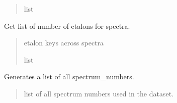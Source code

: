 \documentclass[letterpaper,10pt,english]{sphinxmanual}
\begin{document}
\begin{fulllineitems}
\begin{fulllineitems}
\begin{quote}
\begin{description}
\sphinxAtStartPar
list

\end{description}\end{quote}

\end{fulllineitems}


\begin{fulllineitems}
\label{\detokenize{MATS:MATS.dataset.Dataset.get_dataset_name}}
\pysigstartsignatures
{}
\pysigstopsignatures
\end{fulllineitems}


\begin{fulllineitems}
\label{\detokenize{MATS:MATS.dataset.Dataset.get_etalons}}
\pysigstartsignatures
{}
\pysigstopsignatures
\sphinxAtStartPar
Get list of number of etalons for spectra.
\begin{quote}\begin{description}
\sphinxAtStartPar
{} \textendash{} etalon keys across spectra

\sphinxAtStartPar
list

\end{description}\end{quote}

\end{fulllineitems}


\begin{fulllineitems}
\label{\detokenize{MATS:MATS.dataset.Dataset.get_list_spectrum_numbers}}
\pysigstartsignatures
{}
\pysigstopsignatures
\sphinxAtStartPar
Generates a list of all spectrum\_numbers.
\begin{quote}\begin{description}
\sphinxAtStartPar
{} \textendash{} list of all spectrum numbers used in the dataset.


\end{description}
\end{quote}
\end{fulllineitems}
\end{fulllineitems}
\end{document}
